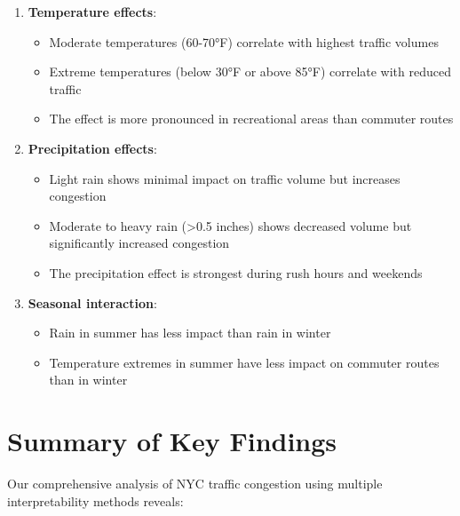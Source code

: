 \documentclass[
  letterpaper,
  DIV=11,
  numbers=noendperiod]{scrreprt}
\providecommand{\tightlist}{%
  \setlength{\itemsep}{0pt}\setlength{\parskip}{0pt}}\usepackage{longtable,booktabs,array}
\begin{document}
\begin{enumerate}
\def\labelenumi{\arabic{enumi}.}
\tightlist
\item
  \textbf{Temperature effects}:

  \begin{itemize}
  \tightlist
  \item
    Moderate temperatures (60-70°F) correlate with highest traffic
    volumes
  \item
    Extreme temperatures (below 30°F or above 85°F) correlate with
    reduced traffic
  \item
    The effect is more pronounced in recreational areas than commuter
    routes
  \end{itemize}
\item
  \textbf{Precipitation effects}:

  \begin{itemize}
  \tightlist
  \item
    Light rain shows minimal impact on traffic volume but increases
    congestion
  \item
    Moderate to heavy rain (\textgreater0.5 inches) shows decreased
    volume but significantly increased congestion
  \item
    The precipitation effect is strongest during rush hours and weekends
  \end{itemize}
\item
  \textbf{Seasonal interaction}:

  \begin{itemize}
  \tightlist
  \item
    Rain in summer has less impact than rain in winter
  \item
    Temperature extremes in summer have less impact on commuter routes
    than in winter
  \end{itemize}
\end{enumerate}

\section{Summary of Key Findings}\label{summary-of-key-findings}

Our comprehensive analysis of NYC traffic congestion using multiple
interpretability methods reveals:
\end{document}
